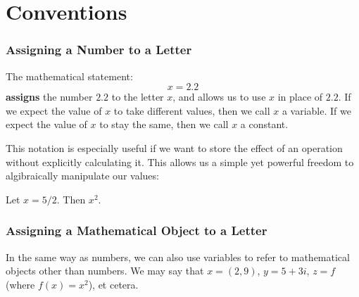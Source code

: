 \section{Conventions}
  \subsubsection{Assigning a Number to a Letter}
  The mathematical statement:
  $$x = 2.2$$
  \textbf{assigns} the number $2.2$ to the letter $x$, and allows us to use $x$
  in place of $2.2$. If we expect the value of $x$ to take different values,
  then we call $x$ a variable. If we expect the value of $x$ to stay the same,
  then we call $x$ a constant.

  This notation is especially useful if we want to store the effect of an
  operation without explicitly calculating it. This allows us a simple yet
  powerful freedom to algibraically manipulate our values:

  \begin{expl}{}
    Let $x = {5}/{2}$. Then $x^2$.
  \end{expl}

  \subsubsection{Assigning a Mathematical Object to a Letter}
  In the same way as numbers, we can also use variables to refer to
  mathematical objects other than numbers. We may say that $x = (2, 9)$,
  $y = 5 + 3i$, $z = f$ (where $f(x) = x^2$), et cetera.
